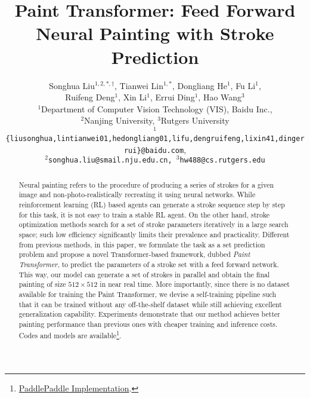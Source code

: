 \documentclass[10pt,twocolumn,letterpaper]{article}
\begin{document}
\title{Paint Transformer: Feed Forward Neural Painting with Stroke Prediction}

\author{Songhua Liu$^{1,2,*,\dag}$, Tianwei Lin$^{1,*}$, Dongliang He$^1$, Fu Li$^1$,\\Ruifeng Deng$^1$, Xin Li$^1$, Errui Ding$^1$, Hao Wang$^3$\\
$^1$Department of Computer Vision Technology (VIS), Baidu Inc.,\\
$^2$Nanjing University, $^3$Rutgers University\\
{\tt\small $^1$\{liusonghua,lintianwei01,hedongliang01,lifu,dengruifeng,lixin41,dingerrui\}@baidu.com},\\
{\tt\small $^2$songhua.liu@smail.nju.edu.cn, $^3$hw488@cs.rutgers.edu}\\
}

\twocolumn[{\maketitle
\begin{figure}[H]
\hsize=\textwidth \centering
\vspace{-1cm}
\texttt{[image: Figure/first\_page.png]}
\caption{Illustration of our results. The second row demonstrates the progressive painting process. Zoom-in for better view.}
\label{fig:overview}
\end{figure}
}]

\renewcommand{\thefootnote}{\fnsymbol{footnote}}
\renewcommand{\thefootnote}{\arabic{footnote}}

\ificcvfinal\thispagestyle{empty}\fi

\begin{abstract}
   Neural painting refers to the procedure of producing a series of strokes for a given image and non-photo-realistically recreating it using neural networks. 
   While reinforcement learning (RL) based agents can generate a stroke sequence step by step for this task, it is not easy to train a stable RL agent. 
   On the other hand, stroke optimization methods search for a set of stroke parameters iteratively in a large search space; such low efficiency significantly limits their prevalence and practicality. 
   Different from previous methods, in this paper, we formulate the task as a set prediction problem and propose a novel Transformer-based framework, dubbed \textit{Paint Transformer}, to predict the parameters of a stroke set with a feed forward network.
   This way, our model can generate a set of strokes in parallel and obtain the final painting of size $512\times 512$ in near real time. 
   More importantly, since there is no dataset available for training the Paint Transformer, we devise a self-training pipeline such that it can be trained without any off-the-shelf dataset while still achieving excellent generalization capability.
   Experiments demonstrate that our method achieves better painting performance than previous ones with cheaper training and inference costs. Codes and models are available\footnote{\href{https://github.com/wzmsltw/PaintTransformer}{PaddlePaddle Implementation}.}.
\end{abstract}
\end{document}
